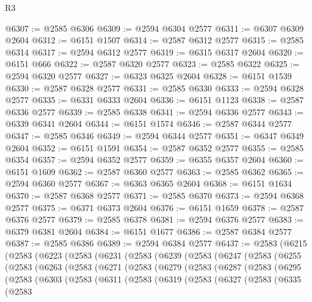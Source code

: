 \begin{lexlean}{R3}
\begin{coremodule}
@6307 := @2585 @6306
@6309 := @2594 @6304 @2577
@6311 := @6307 @6309 @2604
@6312 := @6151 @1507
@6314 := @2587 @6312 @2577
@6315 := @2585 @6314
@6317 := @2594 @6312 @2577
@6319 := @6315 @6317 @2604
@6320 := @6151 @666
@6322 := @2587 @6320 @2577
@6323 := @2585 @6322
@6325 := @2594 @6320 @2577
@6327 := @6323 @6325 @2604
@6328 := @6151 @1539
@6330 := @2587 @6328 @2577
@6331 := @2585 @6330
@6333 := @2594 @6328 @2577
@6335 := @6331 @6333 @2604
@6336 := @6151 @1123
@6338 := @2587 @6336 @2577
@6339 := @2585 @6338
@6341 := @2594 @6336 @2577
@6343 := @6339 @6341 @2604
@6344 := @6151 @1574
@6346 := @2587 @6344 @2577
@6347 := @2585 @6346
@6349 := @2594 @6344 @2577
@6351 := @6347 @6349 @2604
@6352 := @6151 @1591
@6354 := @2587 @6352 @2577
@6355 := @2585 @6354
@6357 := @2594 @6352 @2577
@6359 := @6355 @6357 @2604
@6360 := @6151 @1609
@6362 := @2587 @6360 @2577
@6363 := @2585 @6362
@6365 := @2594 @6360 @2577
@6367 := @6363 @6365 @2604
@6368 := @6151 @1634
@6370 := @2587 @6368 @2577
@6371 := @2585 @6370
@6373 := @2594 @6368 @2577
@6375 := @6371 @6373 @2604
@6376 := @6151 @1659
@6378 := @2587 @6376 @2577
@6379 := @2585 @6378
@6381 := @2594 @6376 @2577
@6383 := @6379 @6381 @2604
@6384 := @6151 @1677
@6386 := @2587 @6384 @2577
@6387 := @2585 @6386
@6389 := @2594 @6384 @2577
@6437 := @2583
    (@6215
      (@2583
        (@6223
          (@2583
            (@6231
              (@2583
                (@6239
                  (@2583
                    (@6247
                      (@2583
                        (@6255
                          (@2583
                            (@6263
                              (@2583
                                (@6271
                                  (@2583
                                    (@6279
                                      (@2583
                                        (@6287
                                          (@2583
                                            (@6295
                                              (@2583
                                                (@6303
                                                  (@2583
                                                    (@6311
                                                      (@2583
                                                        (@6319
                                                          (@2583
                                                            (@6327
                                                              (@2583
                                                                (@6335
                                                                  (@2583

\end{coremodule}
\end{lexlean}

